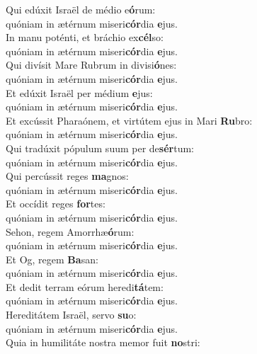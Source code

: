 \evenverse Qui edúxit Israël de médio e\textbf{ó}rum:~\*\\
\evenverse quóniam in ætérnum miseri\textbf{cór}dia \textbf{e}jus.\\
\oddverse In manu poténti, et bráchio ex\textbf{cél}so:~\*\\
\oddverse quóniam in ætérnum miseri\textbf{cór}dia \textbf{e}jus.\\
\evenverse Qui divísit Mare Rubrum in divisi\textbf{ó}nes:~\*\\
\evenverse quóniam in ætérnum miseri\textbf{cór}dia \textbf{e}jus.\\
\oddverse Et edúxit Israël per médium \textbf{e}jus:~\*\\
\oddverse quóniam in ætérnum miseri\textbf{cór}dia \textbf{e}jus.\\
\evenverse Et excússit Pharaónem, et virtútem ejus in Mari \textbf{Ru}bro:~\*\\
\evenverse quóniam in ætérnum miseri\textbf{cór}dia \textbf{e}jus.\\
\oddverse Qui tradúxit pópulum suum per de\textbf{sér}tum:~\*\\
\oddverse quóniam in ætérnum miseri\textbf{cór}dia \textbf{e}jus.\\
\evenverse Qui percússit reges \textbf{ma}gnos:~\*\\
\evenverse quóniam in ætérnum miseri\textbf{cór}dia \textbf{e}jus.\\
\oddverse Et occídit reges \textbf{for}tes:~\*\\
\oddverse quóniam in ætérnum miseri\textbf{cór}dia \textbf{e}jus.\\
\evenverse Sehon, regem Amorrhæ\textbf{ó}rum:~\*\\
\evenverse quóniam in ætérnum miseri\textbf{cór}dia \textbf{e}jus.\\
\oddverse Et Og, regem \textbf{Ba}san:~\*\\
\oddverse quóniam in ætérnum miseri\textbf{cór}dia \textbf{e}jus.\\
\evenverse Et dedit terram eórum heredi\textbf{tá}tem:~\*\\
\evenverse quóniam in ætérnum miseri\textbf{cór}dia \textbf{e}jus.\\
\oddverse Hereditátem Israël, servo \textbf{su}o:~\*\\
\oddverse quóniam in ætérnum miseri\textbf{cór}dia \textbf{e}jus.\\
\evenverse Quia in humilitáte nostra memor fuit \textbf{no}stri:~\*\\
